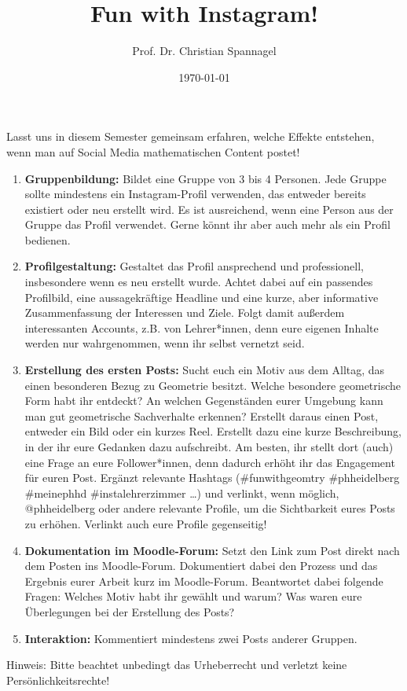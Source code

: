 \documentclass{../cssheet}
\title{Fun with Instagram!}
\author{Prof. Dr. Christian Spannagel}
\date{\today}
\begin{document}
\printtitle

Lasst uns in diesem Semester gemeinsam erfahren, welche Effekte entstehen, wenn man auf Social Media mathematischen Content postet!

\begin{enumerate}
\item \textbf{Gruppenbildung:} Bildet eine Gruppe von 3 bis 4 Personen. Jede Gruppe sollte mindestens ein Instagram-Profil verwenden, das entweder bereits existiert oder neu erstellt wird. Es ist ausreichend, wenn eine Person aus der Gruppe das Profil verwendet. Gerne könnt ihr aber auch mehr als ein Profil bedienen.
\item \textbf{Profilgestaltung:}  Gestaltet das Profil ansprechend und professionell, insbesondere wenn es neu erstellt wurde. Achtet dabei auf ein passendes Profilbild, eine aussagekräftige Headline und eine kurze, aber informative Zusammenfassung der Interessen und Ziele. Folgt damit außerdem interessanten Accounts, z.B. von Lehrer*innen, denn eure eigenen Inhalte werden nur wahrgenommen, wenn ihr selbst vernetzt seid.
\item \textbf{Erstellung des ersten Posts:} Sucht euch ein Motiv aus dem Alltag, das einen besonderen Bezug zu Geometrie besitzt. Welche besondere geometrische Form habt ihr entdeckt? An welchen Gegenständen eurer Umgebung kann man gut geometrische Sachverhalte erkennen? Erstellt daraus einen Post, entweder ein Bild oder ein kurzes Reel. Erstellt dazu eine kurze Beschreibung, in der ihr eure Gedanken dazu aufschreibt. Am besten, ihr stellt dort (auch) eine Frage an eure Follower*innen, denn dadurch erhöht ihr das Engagement für euren Post. Ergänzt relevante Hashtags (\#funwithgeomtry \#phheidelberg \#meinephhd \#instalehrerzimmer \ldots) und verlinkt, wenn möglich, @phheidelberg oder andere relevante Profile, um die Sichtbarkeit eures Posts zu erhöhen. Verlinkt auch eure Profile gegenseitig!
\item \textbf{Dokumentation im Moodle-Forum:} Setzt den Link zum Post direkt nach dem Posten ins Moodle-Forum. Dokumentiert dabei den Prozess und das Ergebnis eurer Arbeit kurz im Moodle-Forum. Beantwortet dabei folgende Fragen: Welches Motiv habt ihr gewählt und warum? Was waren eure Überlegungen bei der Erstellung des Posts?
\item \textbf{Interaktion:} Kommentiert mindestens zwei Posts anderer Gruppen. 
\end{enumerate}

Hinweis: Bitte beachtet unbedingt das Urheberrecht und verletzt keine Persönlichkeitsrechte!


\vspace*{10mm}

\printlicense

\printsocials
\end{document}
